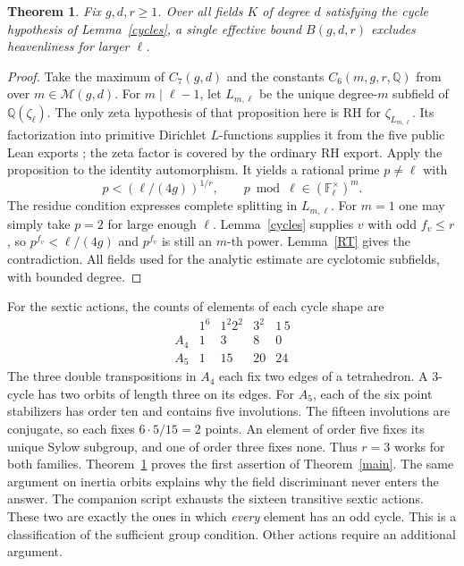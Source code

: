 \documentclass[11pt]{article}
\newtheorem{theorem}{Theorem}
\newcommand{\Q}{\mathbb Q}
\newcommand{\F}{\mathbb F}
\begin{document}
\begin{theorem}\label{general}
Fix $g,d,r\ge1$. Over all fields $K$ of degree $d$ satisfying the
cycle hypothesis of Lemma~\ref{cycles}, a single effective bound
$B(g,d,r)$ excludes heavenliness for larger $\ell$.
\end{theorem}
\begin{proof}
Take the maximum of $C_7(g,d)$ and the constants
$C_6(m,g,r,\Q)$ from \cite[Prop.~2.7]{rt} over
$m\in\mathcal M(g,d)$. For $m\mid\ell-1$, let $L_{m,\ell}$
be the unique degree-$m$ subfield of $\Q(\zeta_\ell)$.
The only zeta hypothesis of that proposition here is RH for
$\zeta_{L_{m,\ell}}$. Its factorization into primitive Dirichlet
$L$-functions supplies it from the five public Lean exports
\cite{lean}; the zeta factor is covered by the ordinary RH export.
Apply the proposition to the identity automorphism. It yields
a rational prime $p\ne\ell$ with
\[
               p<(\ell/(4g))^{1/r},\qquad
               p\bmod\ell\in(\F_\ell^\times)^m .
\]
The residue condition expresses complete splitting in $L_{m,\ell}$.
For $m=1$ one may simply take $p=2$ for large enough $\ell$.
Lemma~\ref{cycles} supplies $v$ with odd $f_v\le r$,
so $p^{f_v}<\ell/(4g)$ and $p^{f_v}$ is still an $m$-th power.
Lemma~\ref{RT} gives the contradiction. All fields used for the
analytic estimate are cyclotomic subfields, with bounded degree.
\end{proof}

For the sextic actions, the counts of elements of each cycle shape are
\[
\begin{array}{c|rrrr}
 &1^6&1^2 2^2&3^2&1\,5\\ \hline
 A_4&1&3&8&0\\
 A_5&1&15&20&24
\end{array}
\]
The three double transpositions in $A_4$ each fix two edges of a
tetrahedron. A $3$-cycle has two orbits of length three on its edges.
For $A_5$, each of the six point stabilizers has order ten and
contains five involutions. The fifteen involutions are conjugate, so
each fixes $6\cdot5/15=2$ points. An element of order five fixes its
unique Sylow subgroup, and one of order three fixes none.
Thus $r=3$ works for both families. Theorem~\ref{general} proves
the first assertion of Theorem~\ref{main}. The same argument on
inertia orbits explains why the field discriminant never enters
the answer. The companion script exhausts the sixteen transitive
sextic actions. These two are exactly the ones in which \emph{every}
element has an odd cycle. This is a classification of the sufficient
group condition. Other actions require an additional argument.
\end{document}
